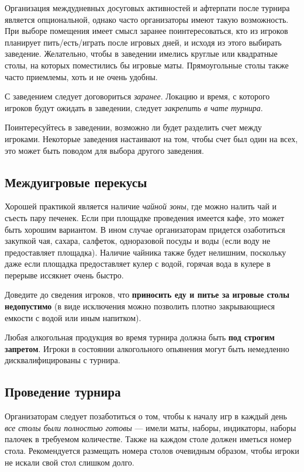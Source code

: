 Организация междудневных досуговых активностей и афтерпати после турнира является опциональной, однако часто организаторы имеют такую возможность. При выборе помещения имеет смысл заранее поинтересоваться, кто из игроков планирует пить/есть/играть после игровых дней, и исходя из этого выбирать заведение. Желательно, чтобы в заведении имелись круглые или квадратные столы, на которых поместились бы игровые маты. Прямоугольные столы также часто приемлемы, хоть и не очень удобны.

С заведением следует договориться \textit{заранее}. Локацию и время, с которого игроков будут ожидать в заведении, следует \textit{закрепить в чате турнира}.

Поинтересуйтесь в заведении, возможно ли будет разделить счет между игроками. Некоторые заведения настаивают на том, чтобы счет был один на всех, это может быть поводом для выбора другого заведения.

\subsection{Междуигровые перекусы}

Хорошей практикой является наличие \textit{чайной зоны}, где можно налить чай и съесть пару печенек. Если при площадке проведения имеется кафе, это может быть хорошим вариантом. В ином случае организаторам придется озаботиться закупкой чая, сахара, салфеток, одноразовой посуды и воды (если воду не предоставляет площадка). Наличие чайника также будет нелишним, поскольку даже если площадка предоставляет кулер с водой, горячая вода в кулере в перерыве иссякнет очень быстро.

Доведите до сведения игроков, что \textbf{приносить еду и питье за игровые столы недопустимо} (в виде исключения можно позволить плотно закрывающиеся емкости с водой или иным напитком).

Любая алкогольная продукция во время турнира должна быть \textbf{под строгим запретом}. Игроки в состоянии алкогольного опьянения могут быть немедленно дисквалифицированы с турнира.

\subsection{Проведение турнира}

Организаторам следует позаботиться о том, чтобы к началу игр в каждый день \textit{все столы были полностью готовы} --- имели маты, наборы, индикаторы, наборы палочек в требуемом количестве. Также на каждом столе должен иметься номер стола. Рекомендуется размещать номера столов очевидным образом, чтобы игроки не искали свой стол слишком долго.

